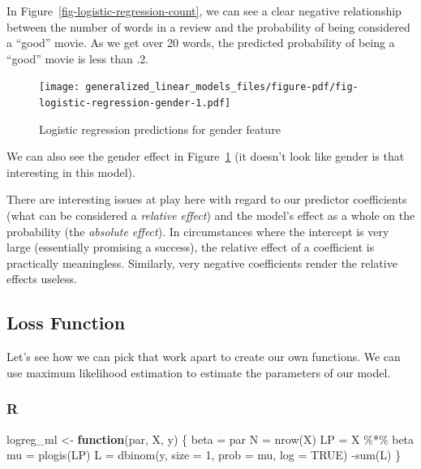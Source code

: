 \documentclass[
  letterpaper,
]{krantz}
\newenvironment{Shaded}{}{}
\newcommand{\AttributeTok}[1]{\textcolor[rgb]{0.49,0.56,0.16}{#1}}
\newcommand{\ConstantTok}[1]{\textcolor[rgb]{0.53,0.00,0.00}{#1}}
\newcommand{\ControlFlowTok}[1]{\textcolor[rgb]{0.00,0.44,0.13}{\textbf{#1}}}
\newcommand{\DecValTok}[1]{\textcolor[rgb]{0.25,0.63,0.44}{#1}}
\newcommand{\FunctionTok}[1]{\textcolor[rgb]{0.02,0.16,0.49}{#1}}
\newcommand{\NormalTok}[1]{#1}
\newcommand{\OtherTok}[1]{\textcolor[rgb]{0.00,0.44,0.13}{#1}}
\newcommand{\SpecialCharTok}[1]{\textcolor[rgb]{0.25,0.44,0.63}{#1}}
\begin{document}
In Figure~\ref{fig-logistic-regression-count}, we can see a clear
negative relationship between the number of words in a review and the
probability of being considered a ``good'' movie. As we get over 20
words, the predicted probability of being a ``good'' movie is less than
.2.

\begin{figure}

{\centering \texttt{[image: generalized\_linear\_models\_files/figure-pdf/fig-logistic-regression-gender-1.pdf]}

}

\caption{\label{fig-logistic-regression-gender}Logistic regression
predictions for gender feature}

\end{figure}

We can also see the gender effect in
Figure~\ref{fig-logistic-regression-gender} (it doesn't look like gender
is that interesting in this model).

There are interesting issues at play here with regard to our predictor
coefficients (what can be considered a \emph{relative effect}) and the
model's effect as a whole on the probability (the \emph{absolute
effect}). In circumstances where the intercept is very large
(essentially promising a success), the relative effect of a coefficient
is practically meaningless. Similarly, very negative coefficients render
the relative effects useless.

\subsection{Loss Function}\label{loss-function}

Let's see how we can pick that work apart to create our own functions.
We can use maximum likelihood estimation to estimate the parameters of
our model.

\subsubsection{R}

\begin{Shaded}
\begin{Highlighting}[]
\NormalTok{logreg\_ml }\OtherTok{\textless{}{-}} \ControlFlowTok{function}\NormalTok{(par, X, y) \{}
\NormalTok{  beta }\OtherTok{=}\NormalTok{ par}
\NormalTok{  N }\OtherTok{=} \FunctionTok{nrow}\NormalTok{(X)}
\NormalTok{  LP }\OtherTok{=}\NormalTok{ X }\SpecialCharTok{\%*\%}\NormalTok{ beta                           }
\NormalTok{  mu }\OtherTok{=} \FunctionTok{plogis}\NormalTok{(LP)                           }
\NormalTok{  L }\OtherTok{=} \FunctionTok{dbinom}\NormalTok{(y, }\AttributeTok{size =} \DecValTok{1}\NormalTok{, }\AttributeTok{prob =}\NormalTok{ mu, }\AttributeTok{log =} \ConstantTok{TRUE}\NormalTok{)   }
  \SpecialCharTok{{-}}\FunctionTok{sum}\NormalTok{(L)                                   }
\NormalTok{\}}
\end{Highlighting}
\end{Shaded}
\end{document}
